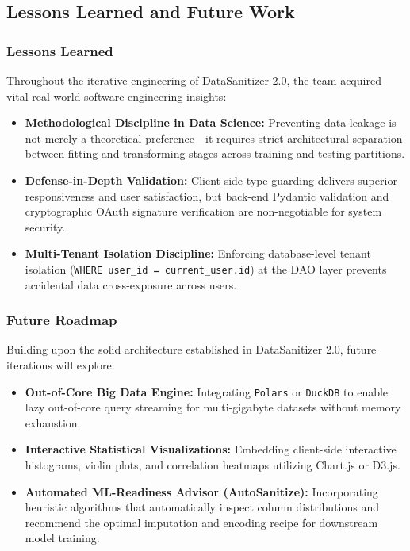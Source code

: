 \subsection{Lessons Learned and Future Work}

\subsubsection{Lessons Learned}
Throughout the iterative engineering of DataSanitizer 2.0, the team acquired vital real-world software engineering insights:
\begin{itemize}
  \item \textbf{Methodological Discipline in Data Science:} Preventing data leakage is not merely a theoretical preference—it requires strict architectural separation between fitting and transforming stages across training and testing partitions.
  \item \textbf{Defense-in-Depth Validation:} Client-side type guarding delivers superior responsiveness and user satisfaction, but back-end Pydantic validation and cryptographic OAuth signature verification are non-negotiable for system security.
  \item \textbf{Multi-Tenant Isolation Discipline:} Enforcing database-level tenant isolation (\texttt{WHERE user\_id = current\_user.id}) at the DAO layer prevents accidental data cross-exposure across users.
\end{itemize}

\subsubsection{Future Roadmap}
Building upon the solid architecture established in DataSanitizer 2.0, future iterations will explore:
\begin{itemize}
  \item \textbf{Out-of-Core Big Data Engine:} Integrating \texttt{Polars} or \texttt{DuckDB} to enable lazy out-of-core query streaming for multi-gigabyte datasets without memory exhaustion.
  \item \textbf{Interactive Statistical Visualizations:} Embedding client-side interactive histograms, violin plots, and correlation heatmaps utilizing Chart.js or D3.js.
  \item \textbf{Automated ML-Readiness Advisor (AutoSanitize):} Incorporating heuristic algorithms that automatically inspect column distributions and recommend the optimal imputation and encoding recipe for downstream model training.
\end{itemize}

